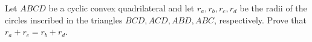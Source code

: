 Let $ABCD$ be a cyclic convex quadrilateral and let $r_a,r_b,r_c,r_d$ be the radii of the circles inscribed in the triangles $BCD, ACD, ABD, ABC$,  respectively. Prove that $r_a+r_c=r_b+r_d$.